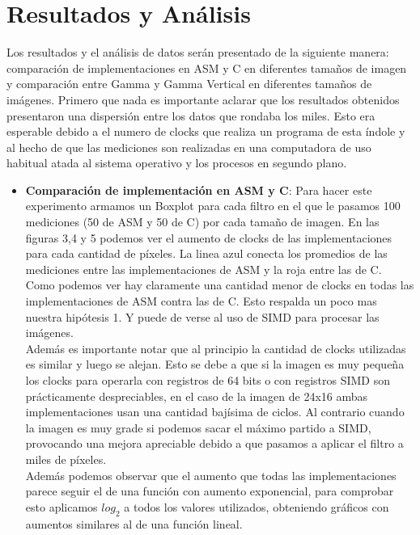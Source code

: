 \documentclass[a4paper]{article}
\begin{document}
\section{Resultados y Análisis}
Los resultados y el análisis de datos serán presentado de la siguiente manera: comparación de implementaciones en ASM y C en diferentes tamaños de imagen y comparación entre Gamma y Gamma Vertical en diferentes tamaños de imágenes.
Primero que nada es importante aclarar que los resultados obtenidos presentaron una dispersión entre los datos que rondaba los miles. Esto era esperable debido a el numero de clocks que realiza un programa de esta índole y al hecho de que las mediciones son realizadas en una computadora de uso habitual atada al sistema operativo y los procesos en segundo plano.

\begin{itemize}
    \item \textbf{Comparación de implementación en ASM y C}:
    Para hacer este experimento armamos un Boxplot para cada filtro en el que le pasamos 100 mediciones (50 de ASM y 50 de C) por cada tamaño de imagen.
    En las figuras 3,4 y 5 podemos ver el aumento de clocks de las implementaciones para cada cantidad de píxeles. La linea azul conecta los promedios de las mediciones entre las implementaciones de ASM y la roja entre las de C.\\
    Como podemos ver hay claramente una cantidad menor de clocks en todas las implementaciones de ASM contra las de C. Esto respalda un poco mas nuestra hipótesis 1. Y puede de verse al uso de SIMD para procesar las imágenes.\\
    Además es importante notar que al principio la cantidad de clocks utilizadas es similar y luego se alejan. Esto se debe a que si la imagen es muy pequeña los clocks para operarla con registros de 64 bits o con registros SIMD son prácticamente despreciables, en el caso de la imagen de 24x16 ambas implementaciones usan una cantidad bajísima de ciclos. Al contrario cuando la imagen es muy grade si podemos sacar el máximo partido a SIMD, provocando una mejora apreciable debido a que pasamos a aplicar el filtro a miles de píxeles.\\
    Además podemos observar que el aumento que todas las implementaciones parece seguir el de una función con aumento exponencial, para comprobar esto aplicamos $log_2$ a todos los valores utilizados, obteniendo gráficos con aumentos similares al de una función lineal.

\end{itemize}
\end{document}
